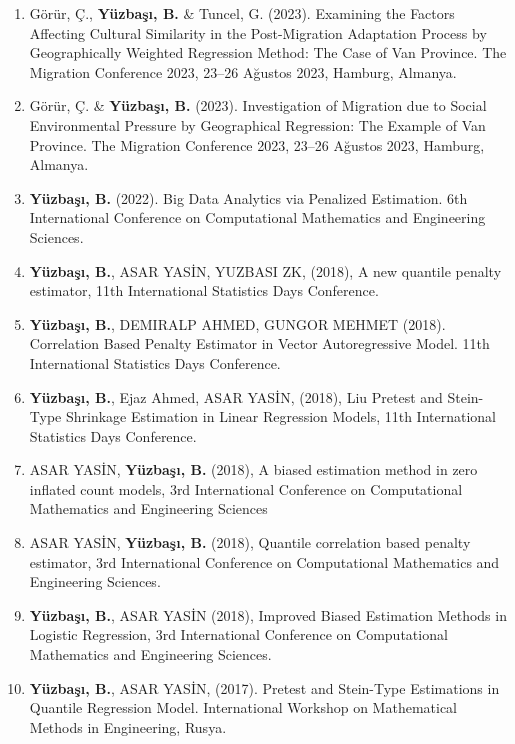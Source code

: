 \documentclass[10pt,a4paper]{article}
\newenvironment{etaremune}{\begin{enumerate}}{\end{enumerate}}
\begin{document}
\begin{etaremune}
\item Görür, Ç., {\bf Y\"{u}zba\c{s}{\i}, B.} \& Tuncel, G. (2023). Examining the Factors Affecting Cultural Similarity in the Post-Migration Adaptation Process by Geographically Weighted Regression Method: The Case of Van Province. The Migration Conference 2023, 23--26 Ağustos 2023, Hamburg, Almanya.
\item Görür, Ç. \& {\bf Y\"{u}zba\c{s}{\i}, B.} (2023). Investigation of Migration due to Social Environmental Pressure by Geographical Regression: The Example of Van Province. The Migration Conference 2023, 23--26 Ağustos 2023, Hamburg, Almanya.

\item  {\bf Y\"{u}zba\c{s}{\i}, B.} (2022). Big Data Analytics via Penalized Estimation. 6th International Conference on Computational Mathematics and Engineering Sciences.

\item  {\bf Y\"{u}zba\c{s}{\i}, B.}, ASAR YASİN, YUZBASI ZK, (2018), A new quantile penalty estimator, 11th International Statistics Days Conference. 

\item  {\bf Y\"{u}zba\c{s}{\i}, B.}, DEMIRALP AHMED, GUNGOR MEHMET (2018).  Correlation Based Penalty Estimator in Vector Autoregressive Model.  11th International Statistics Days Conference.

\item  {\bf Y\"{u}zba\c{s}{\i}, B.}, Ejaz Ahmed, ASAR YASİN, (2018), Liu Pretest and Stein-Type Shrinkage Estimation in Linear Regression Models, 11th International Statistics Days Conference. 

\item  ASAR YASİN, {\bf Y\"{u}zba\c{s}{\i}, B.} (2018), A biased estimation method in zero inflated count models, 3rd International Conference on Computational Mathematics and Engineering Sciences

\item  ASAR YASİN, {\bf Y\"{u}zba\c{s}{\i}, B.} (2018), Quantile correlation based penalty estimator, 3rd International Conference on Computational Mathematics and Engineering Sciences. 

\item  {\bf Y\"{u}zba\c{s}{\i}, B.}, ASAR YASİN (2018), Improved Biased Estimation Methods in Logistic Regression, 3rd International Conference on Computational Mathematics and Engineering Sciences.

\item  {\bf Y\"{u}zba\c{s}{\i}, B.}, ASAR YASİN, (2017).  Pretest and Stein-Type Estimations in Quantile Regression Model. International Workshop on Mathematical Methods in Engineering, Rusya.


\end{etaremune}
\end{document}
